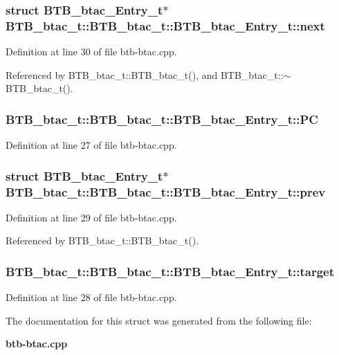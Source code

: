 \subsubsection[{next}]{\setlength{\rightskip}{0pt plus 5cm}struct {\bf BTB\_\-btac\_\-Entry\_\-t}$\ast$ BTB\_\-btac\_\-t::BTB\_\-btac\_\-t::BTB\_\-btac\_\-Entry\_\-t::next\hspace{0.3cm}{\tt  [read]}}\label{structBTB__btac__t_1_1BTB__btac__Entry__t_fa5dd7e22e2aca715904ff54dc36dad7}




Definition at line 30 of file btb-btac.cpp.

Referenced by BTB\_\-btac\_\-t::BTB\_\-btac\_\-t(), and BTB\_\-btac\_\-t::$\sim$BTB\_\-btac\_\-t().
\subsubsection[{PC}]{ BTB\_\-btac\_\-t::BTB\_\-btac\_\-t::BTB\_\-btac\_\-Entry\_\-t::PC}\label{structBTB__btac__t_1_1BTB__btac__Entry__t_d736a579cbea8059988ff8742e45e0b7}




Definition at line 27 of file btb-btac.cpp.
\subsubsection[{prev}]{\setlength{\rightskip}{0pt plus 5cm}struct {\bf BTB\_\-btac\_\-Entry\_\-t}$\ast$ BTB\_\-btac\_\-t::BTB\_\-btac\_\-t::BTB\_\-btac\_\-Entry\_\-t::prev\hspace{0.3cm}{\tt  [read]}}\label{structBTB__btac__t_1_1BTB__btac__Entry__t_bea75989d1f999e004bdf99b8f7eb46a}




Definition at line 29 of file btb-btac.cpp.

Referenced by BTB\_\-btac\_\-t::BTB\_\-btac\_\-t().
\subsubsection[{target}]{ BTB\_\-btac\_\-t::BTB\_\-btac\_\-t::BTB\_\-btac\_\-Entry\_\-t::target}\label{structBTB__btac__t_1_1BTB__btac__Entry__t_919a202963420ca65ca54e800db38b43}




Definition at line 28 of file btb-btac.cpp.

The documentation for this struct was generated from the following file:\begin{CompactItemize}
\item 
{\bf btb-btac.cpp}\end{CompactItemize}
